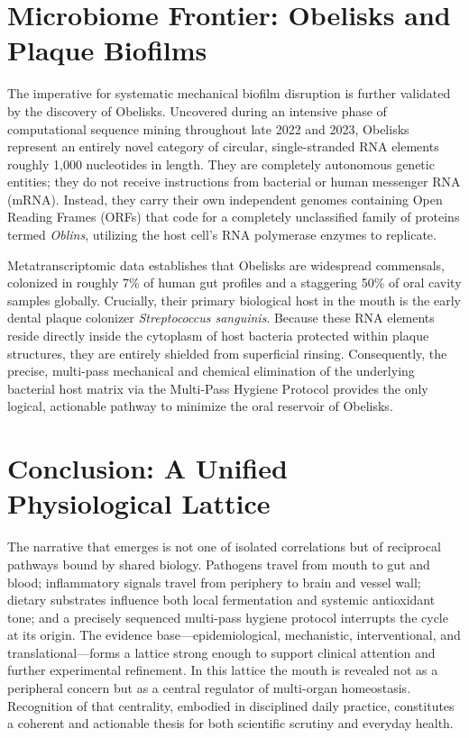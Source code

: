 \section{Microbiome Frontier: Obelisks and Plaque Biofilms}
The imperative for systematic mechanical biofilm disruption is further validated by the discovery of Obelisks. Uncovered during an intensive phase of computational sequence mining throughout late 2022 and 2023, Obelisks represent an entirely novel category of circular, single-stranded RNA elements roughly 1,000 nucleotides in length. They are completely autonomous genetic entities; they do not receive instructions from bacterial or human messenger RNA (mRNA). Instead, they carry their own independent genomes containing Open Reading Frames (ORFs) that code for a completely unclassified family of proteins termed \textit{Oblins}, utilizing the host cell's RNA polymerase enzymes to replicate.

Metatranscriptomic data establishes that Obelisks are widespread commensals, colonized in roughly 7\% of human gut profiles and a staggering 50\% of oral cavity samples globally. Crucially, their primary biological host in the mouth is the early dental plaque colonizer \textit{Streptococcus sanguinis}. Because these RNA elements reside directly inside the cytoplasm of host bacteria protected within plaque structures, they are entirely shielded from superficial rinsing. Consequently, the precise, multi-pass mechanical and chemical elimination of the underlying bacterial host matrix via the Multi-Pass Hygiene Protocol provides the only logical, actionable pathway to minimize the oral reservoir of Obelisks.

\section{Conclusion: A Unified Physiological Lattice}
The narrative that emerges is not one of isolated correlations but of reciprocal pathways bound by shared biology. Pathogens travel from mouth to gut and blood; inflammatory signals travel from periphery to brain and vessel wall; dietary substrates influence both local fermentation and systemic antioxidant tone; and a precisely sequenced multi-pass hygiene protocol interrupts the cycle at its origin. The evidence base---epidemiological, mechanistic, interventional, and translational---forms a lattice strong enough to support clinical attention and further experimental refinement. In this lattice the mouth is revealed not as a peripheral concern but as a central regulator of multi-organ homeostasis. Recognition of that centrality, embodied in disciplined daily practice, constitutes a coherent and actionable thesis for both scientific scrutiny and everyday health.


